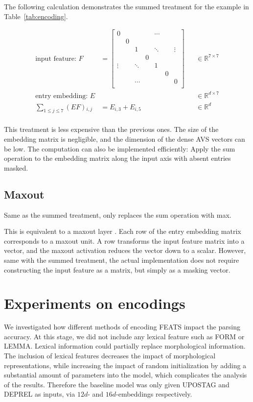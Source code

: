 \documentclass[11pt]{article}
\begin{document}
The following calculation demonstrates the summed treatment for the example in Table~\ref{tab:encoding}.

\begin{align*}
  \text{input feature: } F &= \begin{bmatrix}
    0&&&&\cdots&&\\
    &0&&&&&\\
    &&1&&\ddots&&\vdots\\
    &&&0&&&\\
    \vdots&&\ddots&&1&&\\
    &&&&&0&\\
    &&\cdots&&&&0\\
  \end{bmatrix}& &\in \mathbb{R}^{7 \times 7}\\
  \text{entry embedding: } E && &\in \mathbb{R}^{d \times 7}\\
  \sum_{1 \leq j \leq 7} \left(EF\right){}_{i,j} &= E_{i,3} + E_{i,5}& &\in \mathbb{R}^{d}\\
\end{align*}

This treatment is less expensive than the previous ones.
The size of the embedding matrix is negligible,
and the dimension of the dense AVS vectors can be low.
The computation can also be implemented efficiently:
Apply the sum operation to the embedding matrix along the input axis with absent entries masked.

\subsection*{Maxout}

Same as the summed treatment, only replaces the sum operation with max.

This is equivalent to a maxout layer \parencite{goodfellow2013maxout}.
Each row of the entry embedding matrix corresponds to a maxout unit.
A row transforms the input feature matrix into a vector,
and the maxout activation reduces the vector down to a scalar.
However, same with the summed treatment,
the actual implementation does not require constructing the input feature as a matrix,
but simply as a masking vector.

\section{Experiments on encodings}
\label{sec:res}

We investigated how different methods of encoding FEATS impact the parsing accuracy.
At this stage, we did not include any lexical feature such as FORM or LEMMA\@.
Lexical information could partially replace morphological information.
The inclusion of lexical features decreases the impact of morphological representations,
while increasing the impact of random initialization by adding a substantial amount of parameters into the model,
which complicates the analysis of the results.
Therefore the baseline model was only given UPOSTAG and DEPREL as inputs,
via \(12d\)- and \(16d\)-embeddings respectively.
\end{document}
